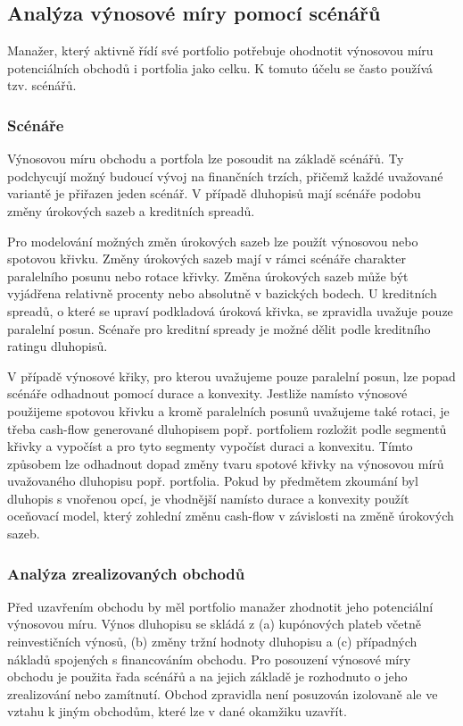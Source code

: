 \documentclass[a4paper]{book}
\begin{document}
\subsection{Analýza výnosové míry pomocí scénářů}

Manažer, který aktivně řídí své portfolio potřebuje ohodnotit výnosovou míru potenciálních obchodů i portfolia jako celku. K tomuto účelu se často používá tzv. scénářů.

\subsubsection{Scénáře}

Výnosovou míru obchodu a portfola lze posoudit na základě scénářů. Ty podchycují možný budoucí vývoj na finančních trzích, přičemž každé uvažované variantě je přiřazen jeden scénář. V případě dluhopisů mají scénáře podobu změny úrokových sazeb a kreditních spreadů.

Pro modelování možných změn úrokových sazeb lze použít výnosovou nebo spotovou křivku. Změny úrokových sazeb mají v rámci scénáře charakter paralelního posunu nebo rotace křivky. Změna úrokových sazeb může být vyjádřena relativně procenty nebo absolutně v bazických bodech. U kreditních spreadů, o které se upraví podkladová úroková křivka, se zpravidla uvažuje pouze paralelní posun. Scénaře pro kreditní spready je možné dělit podle kreditního ratingu dluhopisů. 

V případě výnosové křiky, pro kterou uvažujeme pouze paralelní posun, lze popad scénáře odhadnout pomocí durace a konvexity. Jestliže namísto výnosové použijeme spotovou křivku a kromě paralelních posunů uvažujeme také rotaci, je třeba cash-flow generované dluhopisem popř. portfoliem rozložit podle segmentů křivky a vypočíst a pro tyto segmenty vypočíst duraci a konvexitu. Tímto způsobem lze odhadnout dopad změny tvaru spotové křivky na výnosovou mírů uvažovaného dluhopisu popř. portfolia. Pokud by předmětem zkoumání byl dluhopis s vnořenou opcí, je vhodnější namísto durace a konvexity použít oceňovací model, který zohlední změnu cash-flow v závislosti na změně úrokových sazeb.

\subsubsection{Analýza zrealizovaných obchodů}

Před uzavřením obchodu by měl portfolio manažer zhodnotit jeho potenciální výnosovou míru. Výnos dluhopisu se skládá z (a) kupónových plateb včetně reinvestičních výnosů, (b) změny tržní hodnoty dluhopisu a (c) případných nákladů spojených s financováním obchodu. Pro posouzení výnosové míry obchodu je použita řada scénářů a na jejich základě je rozhodnuto o jeho zrealizování nebo zamítnutí. Obchod zpravidla není posuzován izolovaně ale ve vztahu k jiným obchodům, které lze v dané okamžiku uzavřít.
\end{document}
